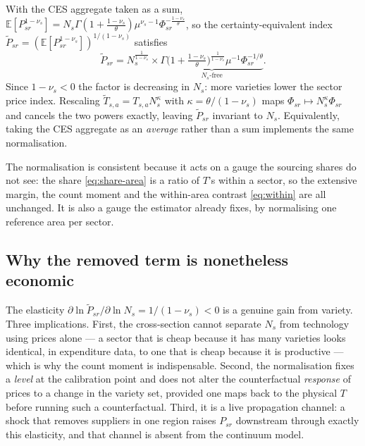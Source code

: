 \documentclass[11pt]{article}
\newcommand{\E}{\mathbb{E}}
\begin{document}
With the CES aggregate taken as a sum, $\E[P_{sr}^{1-\nu_{s}}]=N_{s}\Gamma(1+\tfrac{1-\nu_{s}}{\theta})\mu^{\nu_{s}-1}\Phi_{sr}^{-\frac{1-\nu_{s}}{\theta}}$,
so the certainty-equivalent index $\widetilde P_{sr}=(\E[P_{sr}^{1-\nu_{s}}])^{1/(1-\nu_{s})}$
satisfies
\begin{equation}
\widetilde P_{sr}=N_{s}^{\frac{1}{1-\nu_{s}}}\times\underbrace{\Gamma\!\Big(1+\tfrac{1-\nu_{s}}{\theta}\Big)^{\frac{1}{1-\nu_{s}}}\mu^{-1}\Phi_{sr}^{-1/\theta}}_{N_{s}\text{-free}} .
\label{eq:loveofvariety}
\end{equation}
Since $1-\nu_{s}<0$ the factor is decreasing in $N_{s}$: more varieties lower the sector price
index. Rescaling $\widetilde T_{s,a}=T_{s,a}N_{s}^{\kappa}$ with $\kappa=\theta/(1-\nu_{s})$ maps
$\Phi_{sr}\mapsto N_{s}^{\kappa}\Phi_{sr}$ and cancels the two powers exactly, leaving
$\widetilde P_{sr}$ invariant to $N_{s}$. Equivalently, taking the CES aggregate as an
\emph{average} rather than a sum implements the same normalisation.

The normalisation is consistent because it acts on a gauge the sourcing shares do not see: the
share \eqref{eq:share-area} is a ratio of $T$'s within a sector, so the extensive margin, the count
moment and the within-area contrast \eqref{eq:within} are all unchanged. It is also a gauge the
estimator already fixes, by normalising one reference area per sector.

\subsection*{Why the removed term is nonetheless economic}

The elasticity $\partial\ln\widetilde P_{sr}/\partial\ln N_{s}=1/(1-\nu_{s})<0$ is a genuine gain
from variety. Three implications. First, the cross-section cannot separate $N_{s}$ from technology
using prices alone --- a sector that is cheap because it has many varieties looks identical, in
expenditure data, to one that is cheap because it is productive --- which is why the count moment
is indispensable. Second, the normalisation fixes a \emph{level} at the calibration point and does
not alter the counterfactual \emph{response} of prices to a change in the variety set, provided one
maps back to the physical $T$ before running such a counterfactual. Third, it is a live propagation
channel: a shock that removes suppliers in one region raises $P_{sr}$ downstream through exactly
this elasticity, and that channel is absent from the continuum model.
\end{document}

